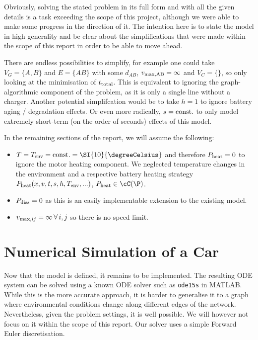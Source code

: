 \documentclass{prettytex/ox/mmsc-special-topic}
\begin{document}
  Obviously, solving the stated problem in its full form and with all the given details is a task exceeding the scope of this project, although we were able to make some progress in the direction of it.
  The intention here is to state the model in high generality and be clear about the simplifications that were made within the scope of this report in order to be able to move ahead.

  There are endless possibilities to simplify, for example one could take
  $V_G = \{A, B\}$ and $E = \{AB\}$ with some $d_{AB}$, $v_{\rm max, AB} = \infty$ and $V_C = \{\}$, so only looking at the minimisation of $t_{\rm total}$. This is equivalent to ignoring the graph-algorithmic component of the problem, as it is only a single line without a charger.
  Another potential simplifcation would be to take $h = 1$ to ignore battery aging / degradation effects. Or even more radically, $s = \rm const.$ to only model extremely short-term (on the order of seconds) effects of this model.

  In the remaining sections of the report, we will assume the following:
  \begin{itemize}
    \tightlist
    \item $T = T_{\rm env} = \rm const. = \SI{10}{\degreeCelsius}$ and therefore $P_{\rm heat} = 0$ to ignore the motor heating component. We neglected temperature changes in the environment and a respective battery heating strategy $P_{\rm heat}(x, v, t, s, h, T_{\rm env}, ...)$, $P_{\rm heat} \in \cC(\P)$.
    \item $P_{\rm diss} = 0$ as this is an easily implementable extension to the existing model.
    \item $v_{{\rm max}, ij} = \infty \,\forall\, i, j$ so there is no speed limit.
  \end{itemize}

  \section{Numerical Simulation of a Car}
  \label{sec:simulator}
  Now that the model is defined, it remains to be implemented.
  The resulting ODE system can be solved using a known ODE solver such as \texttt{ode15s} in MATLAB.
  While this is the more accurate approach, it is harder to generalise it to a graph where environmental conditions change along different edges of the network.
  Nevertheless, given the problem settings, it is well possible.
  We will however not focus on it within the scope of this report.
  Our solver uses a simple Forward Euler discretisation.
\end{document}

